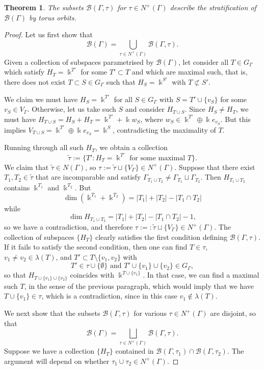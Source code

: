 \documentclass[11pt]{article}
\newtheorem{theorem}[theo]{Theorem}
\theoremstyle{definition}
\numberwithin{equation}{section}
\newcommand\calB{\mathcal{B}}
\newcommand\kk{\Bbbk}
\begin{document}
\begin{theorem}\label{th:orbits}
The subsets $\calB(\Gamma,\tau)$ for $\tau\in N^+(\Gamma)$ describe the stratification of $\calB(\Gamma)$ by torus orbits.
\end{theorem}

\begin{proof}
Let us first show that 
 \[
\calB(\Gamma)=\bigcup_{\tau\in N^+(\Gamma)} \calB(\Gamma,\tau).
 \]
Given a collection of subspaces parametrised by $\calB(\Gamma)$, let consider all $T\in G_\Gamma$ which satisfy $H_T=\kk^{T'}$ for some $T'\subset T$ and which are maximal such, that is, there does not exist $T\subset S\in G_\Gamma$ such that $H_S=\kk^{S'}$ with $T\not\subset S'$. 

We claim we must have $H_S=\kk^{T'}$ for all $S\in G_\Gamma$ with $S=T'\cup\{v_S\}$ for some $v_S\in V_\Gamma$. Otherwise, let us take such $S$ and consider $H_{T\cup S}$. Since $H_S\neq H_T$, we must have $H_{T\cup S}=H_S+H_T= \kk^{T'}+\kk w_S$, where $w_S\in \kk^{T'}\oplus \kk e_{v_S}$. But this implies $V_{T\cup S}=\kk^{T'}\oplus \kk e_{v_S}=\kk^{S}$, contradicting the maximality of $T$.

Running through all such $H_T$, we obtain a collection
 \[
\tilde\tau:=\{T'\colon H_T=\kk^{T'} \text{ for  some maximal } T\}.
 \]
We claim that $\tilde\tau\in N(\Gamma)$, so $\tau:=\tilde\tau\sqcup\{V_\Gamma\}\in N^+(\Gamma)$. Suppose that there exist $T_1,T_2\in\tilde\tau$ that are incomparable and satisfy $\Gamma_{T_1\cup T_2}\ne\Gamma_{T_1}\sqcup\Gamma_{T_2}$. Then $H_{T_1\cup T_2}$ contains $\kk^{T_1}$ and $\kk^{T_2}$. But 
 \[ 
\dim (\kk^{T_1}+\kk^{T_2}) = |T_1|+|T_2|-|T_1\cap T_2|
 \]
while
 \[
\dim H_{T_1\cup T_2} = |T_1|+|T_2|-|T_1\cap T_2|-1,
 \]
so we have a contradiction, and therefore $\tau:=:\tilde\tau\sqcup\{V_\Gamma\}\in N^+(\Gamma)$. The collection of subspaces $\{H_T\}$ clearly satisfies the first condition defining $\calB(\Gamma,\tau)$. If it fails to satisfy the second condition, then 
one can find $T\in\tau$, $v_1\ne v_2\in \lambda(T)$, and $T'\subset T\setminus\{v_1,v_2\}$ with 
 \[
T'\in \tau\cup\{\emptyset\}\text{  and } T'\cup\{v_1\}\cup\{v_2\}\in G_\Gamma,
 \] 
so that $H_{T\cup\{v_1\}\cup\{v_2\}}$ coincides with $\kk^{T\cup\{v_1\}}$. In that case, we can find a maximal such $T$, in the sense of the previous paragraph, which would imply that we have $T\cup\{v_1\}\in \tau$, which is a contradiction, since in this case $v_1\notin \lambda(T)$. 

We next show that the subsets $\calB(\Gamma,\tau)$ for various $\tau\in N^+(\Gamma)$ are disjoint, so that
 \[
\calB(\Gamma)=\bigsqcup_{\tau\in N^+(\Gamma)} \calB(\Gamma,\tau).
 \] 
Suppose we have a collection $\{H_T\}$ contained in $\calB(\Gamma,\tau_1)\cap \calB(\Gamma,\tau_2)$. The argument will depend on whether $\tau_1\cup \tau_2\in N^+(\Gamma)$.


\end{proof}
\end{document}
